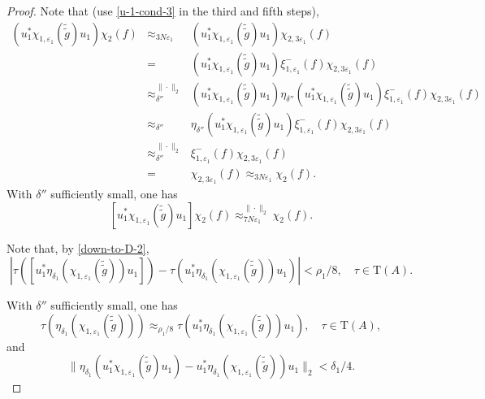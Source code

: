 \documentclass[12pt, oneside, psamsfonts]{amsart}
\theoremstyle{definition}
\theoremstyle{remark}
\numberwithin{equation}{section}
\newcommand{\norm}[1]{\| #1\|}
\newcommand{\abs}[1]{| #1 |}
\newcommand{\eps}{\varepsilon}
\newcommand{\tr}{\mathrm{T}}
\begin{document}
\begin{proof}
Note that (use \eqref{u-1-cond-3} in the third and fifth steps), 
\begin{eqnarray*}
 (u_1^* \chi_{1, \eps_1}(\tilde{\tilde{g}}) u_1)\chi_2(f)
 & \approx_{3N\eps_1} & (u_1^* \chi_{1, \eps_1}(\tilde{\tilde{g}}) u_1)\chi_{2, 3\eps_1}(f) \\
 &=&  (u_1^* \chi_{1, \eps_1}(\tilde{\tilde{g}}) u_1) \xi_{1, \eps_1}^-(f)\chi_{2, 3\eps_1}(f) \\
 & \approx_{\delta''}^{\norm{\cdot}_2} & (u_1^* \chi_{1, \eps_1}(\tilde{\tilde{g}}) u_1) \eta_{\delta''}(u_1^*\chi_{1, \eps_1}(\tilde{\tilde{g}})u_1) \xi_{1, \eps_1}^-(f)\chi_{2, 3\eps_1}(f) \\
& \approx_{\delta''} & \eta_{\delta''}(u_1^*\chi_{1, \eps_1}(\tilde{\tilde{g}})u_1) \xi_{1, \eps_1}^-(f)\chi_{2, 3\eps_1}(f)\\
 & \approx_{\delta''}^{\norm{\cdot}_2} & \xi_{1, \eps_1}^-(f)\chi_{2, 3\eps_1}(f) \\
 & = & \chi_{2, 3\eps_1}(f) \approx_{3N\eps_1} \chi_2(f).
 \end{eqnarray*}
With $\delta''$ sufficiently small, one has 
\begin{equation}\label{id-down-1}
[u^*_1\chi_{1, \eps_1}(\tilde{\tilde{g}}) u_1]\chi_2(f) \approx^{\norm{\cdot}_2}_{7N\eps_1} \chi_2(f). 
\end{equation}



Note that, by \eqref{down-to-D-2}, 
\begin{equation}\label{left-nbhd-1}
 \abs{\tau( [u_1^* \eta_{\delta_1}( \chi_{1, \eps_1}(\tilde{\tilde{g}})) u_1] ) - \tau( u_1^* \eta_{\delta_1}( \chi_{1, \eps_1}(\tilde{\tilde{g}})) u_1 )} < \rho_1/8,\quad \tau \in\tr(A).
 \end{equation}

With $\delta''$ sufficiently small, one has
\begin{equation}\label{left-nbhd-2}
 \tau(\eta_{\delta_1}(\chi_{1, \eps_1}(\tilde{\tilde{g}}))) \approx_{\rho_1/8} \tau(u^*_1\eta_{\delta_1}(\chi_{1, \eps_1}(\tilde{\tilde{g}}))u_1),\quad \tau \in \tr(A), 
 \end{equation}
and
\begin{equation}\label{swap-u-1}
\norm{ \eta_{\delta_1}(u_1^* \chi_{1, \eps_1}(\tilde{\tilde{g}})u_1) - u_1^* \eta_{\delta_1}(\chi_{1, \eps_1}(\tilde{\tilde{g}}))u_1}_2 < \delta_1/4.
\end{equation}


\end{proof}
\end{document}
